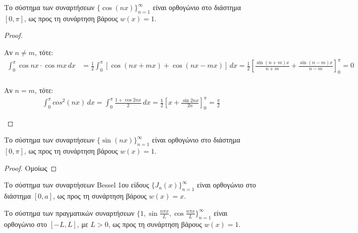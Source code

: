 \begin{prop}
    Το σύστημα των συναρτήσεων $ \{ \cos{(nx)} \}_{n=1}^{\infty} $ είναι ορθογώνιο 
    στο διάστημα $ [0, \pi] $, ως προς τη συνάρτηση βάρους $ w(x)=1 $.

    \begin{proof}
    \item {}
        \begin{myitemize}
        \item Αν $ n \neq m $, τότε:
            \begin{align*}
                \int _{0}^{\pi} \cos{nx} \cdot \cos{mx} \,{dx} &= \frac{1}{2} 
                \int _{0}^{\pi} [\cos{(nx+mx)} + \cos{(nx - mx)}] \,{dx} = 
                \frac{1}{2} 
                \left[\frac{\sin{(n+m)x}}{n+m} + \frac{\sin{(n-m)x}}{n-m}
                \right]_{0}^{\pi} = 0 \\
            \end{align*} 

        \item Αν $ n = m $, τότε:
            \begin{align*}
                \int _{0}^{\pi} cos^{2}(nx) \,{dx} = 
                \int _{0}^{\pi} \frac{1+ \cos{2nx}}{2}
                \,{dx} = 
                \frac{1}{2} \left[x + \frac{\sin{2nx}}{2n}\right]_{0}^{\pi} =
                \frac{\pi}{2} 
            \end{align*}
        \end{myitemize}
    \end{proof}
\end{prop}


\begin{prop}
    Το σύστημα των συναρτήσεων $ \{ \sin{(nx)} \} _{n=1}^{\infty} $ είναι ορθογώνιο
    στο διάστημα $ [0, \pi] $, ως προς τη συνάρτηση βάρους $ w(x)=1 $.
\end{prop}

\begin{proof}
\item {}
    Ομοίως
\end{proof}

\begin{prop}
    Το σύστημα των συναρτήσεων Bessel 1ου είδους $ \{ J_{n}(x) \} _{n=1}^{\infty} $ 
    είναι ορθογώνιο στο διάστημα $ [0,a] $, ως προς τη συνάρτηση βάρους $ w(x)=x $.
\end{prop}

\begin{prop}
    Το σύστημα των πραγματικών συναρτήσεων 
    $ \{ 1, \sin{\frac{n \pi x}{L}, \cos{\frac{n \pi x}{L} } } \}_{n=1}^{\infty} $ 
    είναι ορθογώνιο στο $ [-L,L] $, με $ L>0 $, ως προς τη συνάρτηση βάρους 
    $ w(x)=1 $.
\end{prop}

